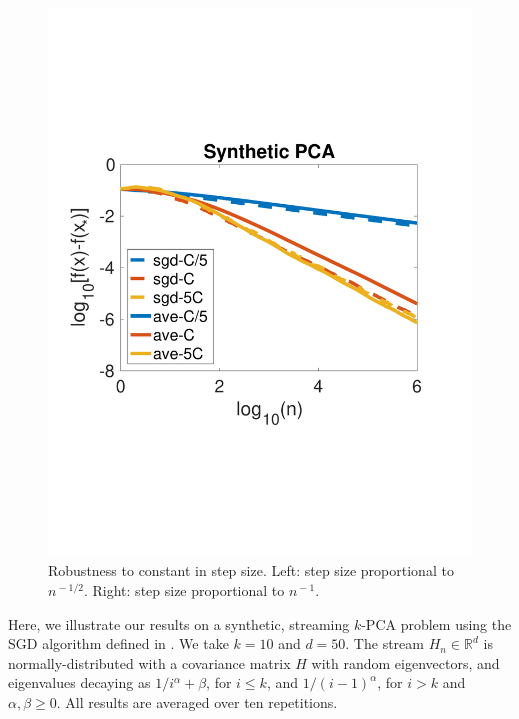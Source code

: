\begin{figure}[!t]
\begin{minipage}[c]{.45\linewidth}
\includegraphics[width=\linewidth]{Figs/dfftc}
   \end{minipage}
   \vspace{-2.3cm}
  \caption{Robustness to constant in step size. Left:
   step size proportional to $n^{\!-\!1/2}$. Right:
   step size proportional to $n^{\!-\!1}$.}
     \label{fig:syntheticrob}
      \vspace{-0.8cm}
\end{figure}
Here, we illustrate our results on a synthetic, streaming $k$-PCA problem using the SGD algorithm defined in . We take $k\!\!=\!\!10$ and $d\!\!=\!\!50$. The stream $H_n\!\!\in\!\!\mathbb{R}^d$ is normally-distributed with a covariance matrix $H$ with random eigenvectors, and eigenvalues decaying as $1/i^\alpha\!+\!\beta$, for $i\leq k$, and $1/(i\!-\!1)^\alpha$, for $i>k$ and $\alpha,\beta\geq0$. All results are averaged over ten repetitions.
